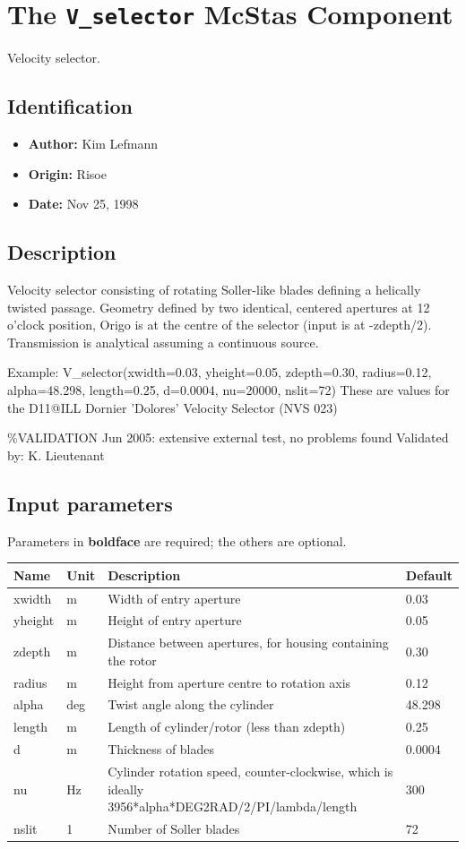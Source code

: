 \section{The \texttt{V\_selector} McStas Component}
Velocity selector.

\subsection*{Identification}
\begin{itemize}
  \item \textbf{Author:} Kim Lefmann
  \item \textbf{Origin:} Risoe
  \item \textbf{Date:} Nov 25, 1998
\end{itemize}

\subsection*{Description}
Velocity selector consisting of rotating Soller-like blades defining a helically twisted passage. Geometry defined by two identical, centered apertures at 12 o'clock position, Origo is at the centre of the selector (input is at -zdepth/2). Transmission is analytical assuming a continuous source.

Example: V\_selector(xwidth=0.03, yheight=0.05, zdepth=0.30, radius=0.12, alpha=48.298, length=0.25, d=0.0004, nu=20000, nslit=72) These are values for the D11@ILL Dornier 'Dolores' Velocity Selector (NVS 023)

\%VALIDATION Jun 2005: extensive external test, no problems found Validated by: K. Lieutenant

\subsection*{Input parameters}
Parameters in \textbf{boldface} are required; the others are optional.

\begin{longtable}{p{}p{}p{}p{}}
\toprule
\textbf{Name} & \textbf{Unit} & \textbf{Description} & \textbf{Default} \\
\midrule
\endhead
xwidth & m & Width of entry aperture & 0.03 \\
yheight & m & Height of entry aperture & 0.05 \\
zdepth & m & Distance between apertures, for housing containing the rotor & 0.30 \\
radius & m & Height from aperture centre to rotation axis & 0.12 \\
alpha & deg & Twist angle along the cylinder & 48.298 \\
length & m & Length of cylinder/rotor (less than zdepth) & 0.25 \\
d & m & Thickness of blades & 0.0004 \\
nu & Hz & Cylinder rotation speed, counter-clockwise, which is ideally 3956*alpha*DEG2RAD/2/PI/lambda/length & 300 \\
nslit & 1 & Number of Soller blades & 72 \\
\bottomrule
\end{longtable}

